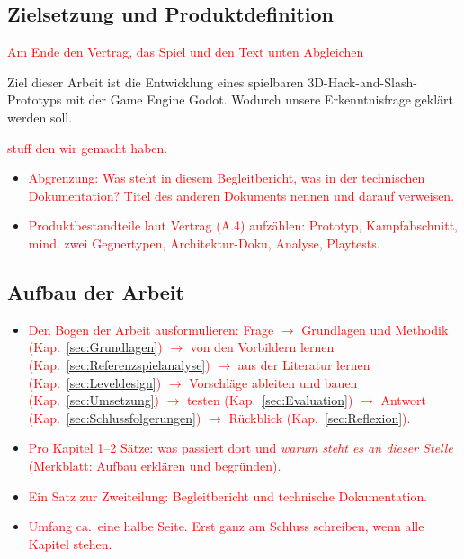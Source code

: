 \documentclass[../Main.tex]{subfiles}
\begin{document}
\subsection{Zielsetzung und Produktdefinition}

\textcolor{red}{Am Ende den Vertrag, das Spiel und den Text unten Abgleichen}

Ziel dieser Arbeit ist die Entwicklung eines spielbaren 3D-Hack-and-Slash-Prototyps mit der Game Engine Godot. Wodurch unsere Erkenntnisfrage geklärt werden soll.

\textcolor{red}{stuff den wir gemacht haben.}

\begin{itemize}[leftmargin=1.5cm]
    \item \textcolor{red}{Abgrenzung: Was steht in diesem Begleitbericht, was in der technischen Dokumentation? Titel des anderen Dokuments nennen und darauf verweisen.}
    \item \textcolor{red}{Produktbestandteile laut Vertrag (A.4) aufzählen: Prototyp, Kampfabschnitt, mind. zwei Gegnertypen, Architektur-Doku, Analyse, Playtests.}
\end{itemize}



\subsection{Aufbau der Arbeit} \label{sec:Aufbau}

\begin{itemize}[leftmargin=1.5cm]
    \item \textcolor{red}{Den Bogen der Arbeit ausformulieren: Frage $\rightarrow$ Grundlagen und Methodik (Kap.~\ref{sec:Grundlagen}) $\rightarrow$ von den Vorbildern lernen (Kap.~\ref{sec:Referenzspielanalyse}) $\rightarrow$ aus der Literatur lernen (Kap.~\ref{sec:Leveldesign}) $\rightarrow$ Vorschläge ableiten und bauen (Kap.~\ref{sec:Umsetzung}) $\rightarrow$ testen (Kap.~\ref{sec:Evaluation}) $\rightarrow$ Antwort (Kap.~\ref{sec:Schlussfolgerungen}) $\rightarrow$ Rückblick (Kap.~\ref{sec:Reflexion}).}
    \item \textcolor{red}{Pro Kapitel 1--2 Sätze: was passiert dort und \emph{warum steht es an dieser Stelle} (Merkblatt: Aufbau erklären und begründen).}
    \item \textcolor{red}{Ein Satz zur Zweiteilung: Begleitbericht und technische Dokumentation.}
    \item \textcolor{red}{Umfang ca.\ eine halbe Seite. Erst ganz am Schluss schreiben, wenn alle Kapitel stehen.}
\end{itemize}

\newpage
\end{document}
